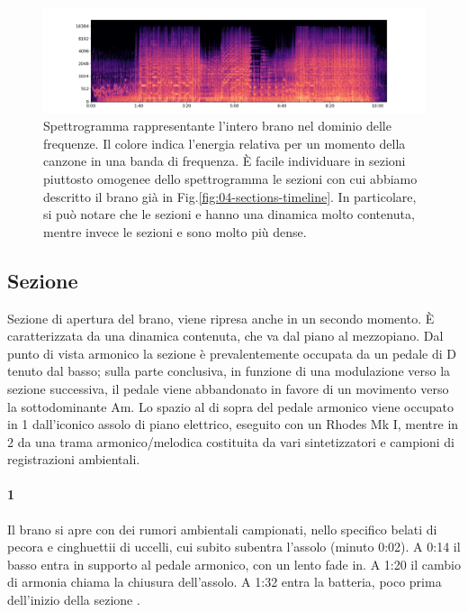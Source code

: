 \documentclass[class=book, crop=false, oneside, 12pt]{standalone}
\begin{document}
    \begin{figure}[htb]
        \centering
        \includegraphics[width=\textwidth]{sheep_spectrogram.png}
        \caption[Spettrogramma rappresentante l'intero brano nel dominio delle frequenze.]{Spettrogramma rappresentante l'intero brano nel dominio delle frequenze. Il colore indica l'energia relativa per un momento della canzone in una banda di frequenza. È facile individuare in sezioni piuttosto omogenee dello spettrogramma le sezioni con cui abbiamo descritto il brano già in Fig.\ref{fig:04-sections-timeline}. In particolare, si può notare che  le sezioni  e  hanno una dinamica molto contenuta, mentre invece le sezioni  e  sono molto più dense.}
        \label{fig:sheep-spectrogram}
    \end{figure}

    \subsection{Sezione }
    Sezione di apertura del brano, viene ripresa anche in un secondo momento. È caratterizzata da una dinamica contenuta, che va dal piano al mezzopiano. Dal punto di vista armonico la sezione è prevalentemente occupata da un pedale di D tenuto dal basso; sulla parte conclusiva, in funzione di una modulazione verso la sezione successiva, il pedale viene abbandonato in favore di un movimento verso la sottodominante Am. Lo spazio al di sopra del pedale armonico viene occupato in 1 dall'iconico assolo di piano elettrico, eseguito con un Rhodes Mk I, mentre in 2 da una trama armonico/melodica costituita da vari sintetizzatori e campioni di registrazioni ambientali.

    \paragraph{1} 
    Il brano si apre con dei rumori ambientali campionati, nello specifico belati di pecora e cinghuettii di uccelli, cui subito  subentra l'assolo (minuto 0:02). A 0:14 il basso entra in supporto al pedale armonico, con un lento fade in. A 1:20 il cambio di armonia chiama la chiusura dell'assolo. A 1:32 entra la batteria, poco prima dell'inizio della sezione .
\end{document}
